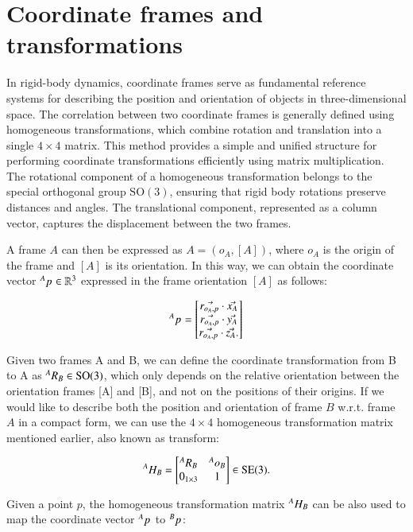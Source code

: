 \section{Coordinate frames and transformations}
In rigid-body dynamics, coordinate frames serve as fundamental reference systems for describing the position and orientation of objects in three-dimensional space. The correlation between two coordinate frames is generally defined using homogeneous transformations, which combine rotation and translation into a single $4 \times 4$ matrix. This method provides a simple and unified structure for performing coordinate transformations efficiently using matrix multiplication. The rotational component of a homogeneous transformation belongs to the special orthogonal group $\text{SO}(3)$, ensuring that rigid body rotations preserve distances and angles. The translational component, represented as a column vector, captures the displacement between the two frames. 

A frame $A$ can then be expressed as $A = (o_A, [A])$, where $o_A$ is the origin of the frame and $[A]$ is its
orientation. In this way, we can obtain the coordinate vector ${}^{A}{p}_{} \in \mathbb{R}^3$ expressed in the frame orientation $[A]$ as follows:

\[
{}^{A}{p}_{} = \begin{bmatrix}
    \vec{r_{o_A,p}} \cdot \vec{x_A} \\ 
    \vec{r_{o_A,p}} \cdot \vec{y_A} \\
    \vec{r_{o_A,p}} \cdot \vec{z_A}.
\end{bmatrix}
\]

Given two frames A and B, we can define the coordinate transformation from B to A as ${}^{A}{R}_{B} \in \text{SO}(3)$, which only depends on the relative orientation
between the orientation frames [A] and [B], and not on the positions of their origins. If we would like to describe both the position and orientation of frame $B$ w.r.t. frame $A$ in a compact form, we can use the $4 \times 4$ homogeneous transformation matrix mentioned earlier, also known as transform:

\[
{}^{A}{H}_{B} = \begin{bmatrix}
    {}^{A}{R}_{B} & {}^{A}{o}_{B} \\
    0_{1\times 3} & 1
\end{bmatrix} \in \text{SE}(3).
\]

Given a point $p$, the homogeneous transformation matrix ${}^{A}{H}_{B}$ can be also
used to map the coordinate vector ${}^{A}{p}_{}$ to ${}^{B}{p}_{}$:

